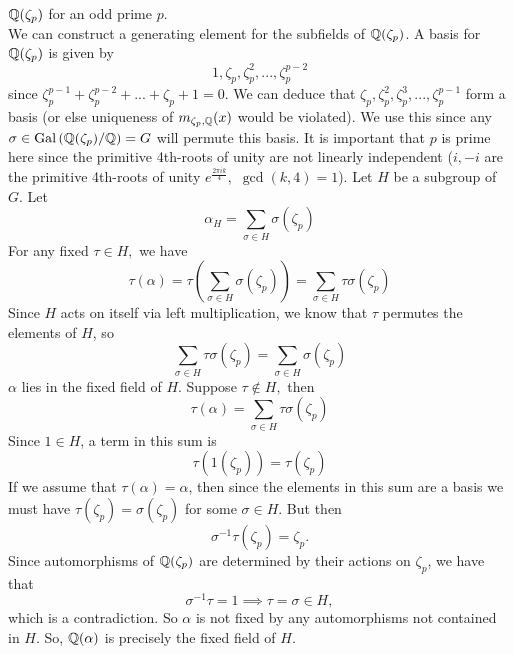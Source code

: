 \begin{example}
    $\mathbb{Q}(\zeta_p)$ for an odd prime $p$. \\
    We can construct a generating element for the subfields of $\mathbb{Q}(\zeta_p)$. A basis for $\mathbb{Q}(\zeta_p)$ is given by
    \[1, \zeta_p, \zeta_p^2, ..., \zeta_p^{p-2}\]
    since $\zeta_p^{p-1} + \zeta_p^{p-2} + ... + \zeta_p + 1 = 0.$ We can deduce that $\zeta_p, \zeta_p^2, \zeta_p^3, ..., \zeta_p^{p-1}$ form a basis (or else uniqueness of $m_{\zeta_p, \mathbb{Q}}(x)$ would be violated). We use this since any $\sigma \in \text{Gal}\left(\mathbb{Q}(\zeta_p)/\mathbb{Q}\right)= G$ will permute this basis. It is important that $p$ is prime here since the primitive 4th-roots of unity are not linearly independent ($i, -i$ are the primitive 4th-roots of unity $e^{\frac{2\pi i k}{4}},$ $\gcd(k,4)=1$). Let $H$ be a subgroup of $G$. Let
    \[\alpha_H = \sum_{\sigma \in H}\sigma(\zeta_p)\]
    For any fixed $\tau \in H,$ we have
    \[\tau(\alpha) = \tau \left(\sum_{\sigma \in H}\sigma(\zeta_p)\right) = \sum_{\sigma \in H}\tau \sigma(\zeta_p)\]
    Since $H$ acts on itself via left multiplication, we know that $\tau$ permutes the elements of $H$, so
    \[\sum_{\sigma \in H}\tau\sigma(\zeta_p) = \sum_{\sigma \in H}\sigma(\zeta_p)\]
    $\alpha$ lies in the fixed field of $H$. Suppose $\tau \not \in H,$ then
    \[\tau(\alpha) = \sum_{\sigma \in H}\tau \sigma(\zeta_p)\]
    Since $1 \in H$, a term in this sum is 
    \[\tau(1(\zeta_p)) = \tau(\zeta_p)\]
    If we assume that $\tau(\alpha) = \alpha$, then since the elements in this sum are a basis we must have $\tau(\zeta_p) = \sigma(\zeta_p)$ for some $\sigma \in H.$ But then
    \[\sigma^{-1}\tau (\zeta_p) = \zeta_p.\]
    Since automorphisms of $\mathbb{Q}(\zeta_p)$ are determined by their actions on $\zeta_p$, we have that 
    \[\sigma^{-1}\tau = 1 \implies \tau  = \sigma \in H,\]
    which is a contradiction. So $\alpha$ is not fixed by any automorphisms not contained in $H$. So, $\mathbb{Q}(\alpha)$ is precisely the fixed field of $H$.
\end{example}

